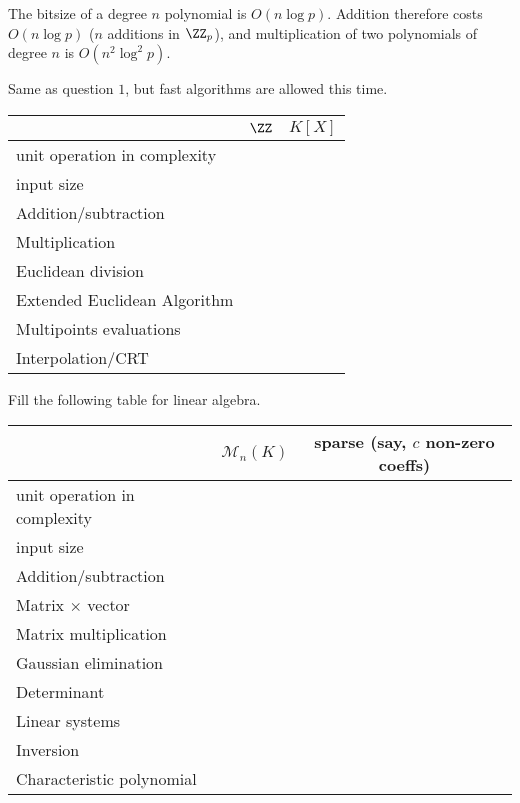 \documentclass[11pt]{exam}
\theoremstyle{definition}
\begin{document}
{\begin{questions}
     \begin{solution}
       The bitsize of a degree $n$ polynomial is $O(n\log p)$. Addition therefore costs $O(n\log p)$ ($n$ additions in $\ZZ_p$), and multiplication of two polynomials of degree $n$ is $O(n^2\log^2 p)$.
     \end{solution}
     

    \question Same as question $1$, but fast algorithms are allowed this time.\\

     \begin{tabular}{l|c|c}
      & \hspace{2cm}$\ZZ$\hspace{2cm} & \hspace{2cm}$K[X]$\hspace{2cm} \\[2pt]\hline
      unit operation in complexity &  & \\[2pt]\hline
      input size & & \\[2pt]\hline
      Addition/subtraction & & \\[2pt]\hline
      Multiplication & & \\[2pt]\hline
      Euclidean division & & \\[2pt]\hline
      Extended Euclidean Algorithm & & \\[2pt]\hline
      Multipoints evaluations & & \\[2pt]\hline
      Interpolation/CRT & &
     \end{tabular}

     \vspace{0.25cm}

     \question Fill the following table for linear algebra.\\
     \begin{tabular}{l|c|c}
      & \hspace{2cm}$\mathcal M_n(K)$\hspace{2cm} & \hspace{1cm}sparse (say, $c$ non-zero coeffs)\hspace{1cm} \\\hline
      unit operation in complexity &  & \\[2pt]\hline
      input size & & \\[2pt]\hline
      Addition/subtraction & & \\[2pt]\hline
      Matrix $\times$ vector & & \\[2pt]\hline
      Matrix multiplication & & \\[2pt]\hline
      Gaussian elimination & & \\[2pt]\hline
      Determinant & & \\[2pt]\hline
       Linear systems & & \\[2pt]\hline
       Inversion & & \\[2pt]\hline
       Characteristic polynomial & & 
     \end{tabular}
     

\end{questions}}
\end{document}
